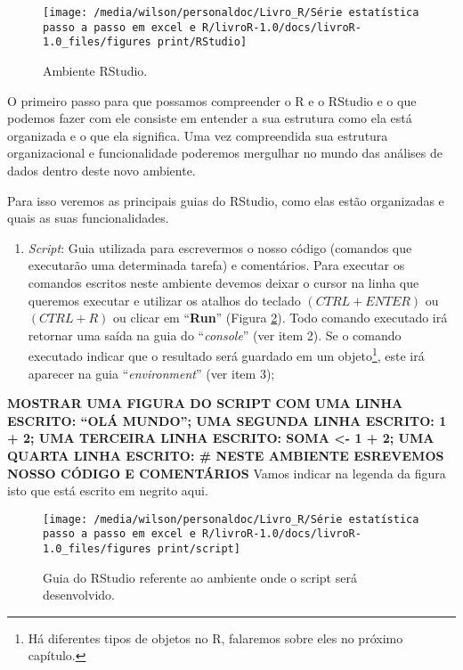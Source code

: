 \documentclass[titlepage, oneside, openany, a4paper]{book}
\providecommand{\tightlist}{%
  \setlength{\itemsep}{0pt}\setlength{\parskip}{0pt}}
\begin{document}
\begin{figure}

{\centering \texttt{[image: /media/wilson/personaldoc/Livro\_R/Série estatística passo a passo em excel e R/livroR-1.0/docs/livroR-1.0\_files/figures print/RStudio]} 

}

\caption{Ambiente RStudio.}\label{fig:RStudio}
\end{figure}

O primeiro passo para que possamos compreender o R e o RStudio e o que podemos fazer com ele consiste em entender a sua estrutura como ela está organizada e o que ela significa. Uma vez compreendida sua estrutura organizacional e funcionalidade poderemos mergulhar no mundo das análises de dados dentro deste novo ambiente.

Para isso veremos as principais guias do RStudio, como elas estão organizadas e quais as suas funcionalidades.

\begin{enumerate}
\def\labelenumi{\arabic{enumi}.}
\tightlist
\item
  \emph{Script}: Guia utilizada para escrevermos o nosso código (comandos que executarão uma determinada tarefa) e comentários. Para executar os comandos escritos neste ambiente devemos deixar o cursor na linha que queremos executar e utilizar os atalhos do teclado \((CTRL + ENTER)\) ou \((CTRL + R)\) ou clicar em ``\textbf{Run}'' (Figura \ref{fig:script}). Todo comando executado irá retornar uma saída na guia do ``\emph{console}'' (ver item 2). Se o comando executado indicar que o resultado será guardado em um objeto\footnote{Há diferentes tipos de objetos no R, falaremos sobre eles no próximo capítulo.}, este irá aparecer na guia ``\emph{environment}'' (ver item 3);
\end{enumerate}

\textbf{MOSTRAR UMA FIGURA DO SCRIPT COM UMA LINHA ESCRITO: ``OLÁ MUNDO''; UMA SEGUNDA LINHA ESCRITO: 1 + 2; UMA TERCEIRA LINHA ESCRITO: SOMA \textless{}- 1 + 2; UMA QUARTA LINHA ESCRITO: \# NESTE AMBIENTE ESREVEMOS NOSSO CÓDIGO E COMENTÁRIOS} Vamos indicar na legenda da figura isto que está escrito em negrito aqui.

\begin{figure}

{\centering \texttt{[image: /media/wilson/personaldoc/Livro\_R/Série estatística passo a passo em excel e R/livroR-1.0/docs/livroR-1.0\_files/figures print/script]} 

}

\caption{Guia do RStudio referente ao ambiente onde o script será desenvolvido.}\label{fig:script}
\end{figure}
\end{document}
